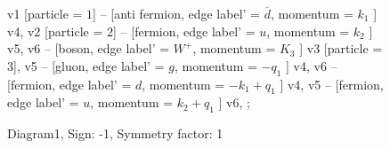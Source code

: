 \documentclass{revtex4}
\begin{document}
\begin{figure}[!htb]
\begin{center}
{    %
v1 [particle = \(1\)] -- [anti fermion, edge label' = \(\overline{d}\), momentum = \(k_{1}\) ] v4, 
v2 [particle = \(2\)] -- [fermion, edge label' = \(u\), momentum = \(k_{2}\) ] v5, 
v6 -- [boson, edge label' = \(W^{+}\), momentum = \(K_{3}\) ] v3 [particle = \(3\)], 
v5 -- [gluon, edge label' = \(g\), momentum = \(-q_{1}\) ] v4, 
v6 -- [fermion, edge label' = \(d\), momentum = \(-k_{1} + q_{1}\) ] v4, 
v5 -- [fermion, edge label' = \(u\), momentum = \(k_{2} + q_{1}\) ] v6, 
};
\end{center}
\caption{Diagram1, Sign: -1, Symmetry factor: 1}
\end{figure}
\newpage
\end{document}
